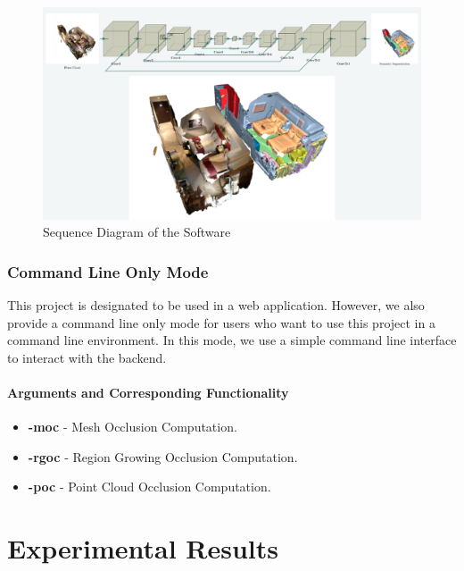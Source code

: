 \documentclass[11pt, a4paper,oneside,chapterprefix=false]{scrbook}
\begin{document}
\begin{minipage}{\textwidth}
    \begin{figure}[H]
        \centering
        \includegraphics*[width=1.0\textwidth]{figures/Minkowski Engine.png}
        \caption{Sequence Diagram of the Software}
        \label{fig:sequence diagram}
    \end{figure}
\end{minipage}

\subsection{Command Line Only Mode}

This project is designated to be used in a web application. However, we also provide a command line only mode for users who want to use this project in a command line environment. In this mode, we use a simple command line interface to interact with the backend.

\subsubsection{Arguments and Corresponding Functionality}

\begin{itemize}
	\item \textbf{-moc} - Mesh Occlusion Computation.
	\item \textbf{-rgoc} - Region Growing Occlusion Computation.
	\item \textbf{-poc} - Point Cloud Occlusion Computation.
\end{itemize}


\chapter{Experimental Results} \label{chp:experiments}
\end{document}
